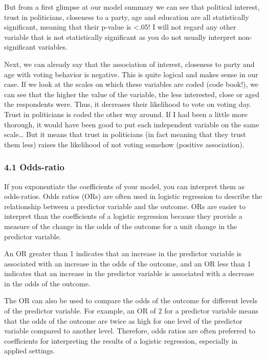 \documentclass[
  letterpaper,
  DIV=11,
  numbers=noendperiod]{scrreprt}
\begin{document}
But from a first glimpse at our model summary we can see that political
interest, trust in politicians, closeness to a party, age and education
are all statistically significant, meaning that their p-value is
\textless.05! I will not regard any other variable that is not
statistically significant as you do not usually interpret
non-significant variables.

Next, we can already say that the association of interest, closeness to
party and age with voting behavior is negative. This is quite logical
and makes sense in our case. If we look at the scales on which these
variables are coded (code book!), we can see that the higher the value
of the variable, the less interested, close or aged the respondents
were. Thus, it decreases their likelihood to vote on voting day. Trust
in politicians is coded the other way around. If I had been a little
more thorough, it would have been good to put each independent variable
on the same scale\ldots{} But it means that trust in politicians (in
fact meaning that they trust them less) raises the likelihood of not
voting somehow (positive association).

\hypertarget{odds-ratio}{%
\subsubsection{4.1 Odds-ratio}\label{odds-ratio}}

If you exponentiate the coefficients of your model, you can interpret
them as odds-ratios. Odds ratios (ORs) are often used in logistic
regression to describe the relationship between a predictor variable and
the outcome. ORs are easier to interpret than the coefficients of a
logistic regression because they provide a measure of the change in the
odds of the outcome for a unit change in the predictor variable.

An OR greater than 1 indicates that an increase in the predictor
variable is associated with an increase in the odds of the outcome, and
an OR less than 1 indicates that an increase in the predictor variable
is associated with a decrease in the odds of the outcome.

The OR can also be used to compare the odds of the outcome for different
levels of the predictor variable. For example, an OR of 2 for a
predictor variable means that the odds of the outcome are twice as high
for one level of the predictor variable compared to another level.
Therefore, odds ratios are often preferred to coefficients for
interpreting the results of a logistic regression, especially in applied
settings.
\end{document}
